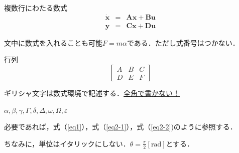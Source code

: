複数行にわたる数式
\begin{eqnarray}
 \bm{\dot x}&=&\bm{Ax}+\bm{Bu}\label{eq2-1} \\
 \bm{y}&=&\bm{Cx}+\bm{Du}\label{eq2-2}
\end{eqnarray}

文中に数式を入れることも可能$F=m\alpha$である．ただし式番号はつかない．

行列
\begin{equation}
 \begin{bmatrix} 
  A & B & C\\ 
  D & E & F 
 \end{bmatrix}
\end{equation}

ギリシャ文字は数式環境で記述する．\underline{全角で書かない！}

$\alpha,\beta,\gamma,\Gamma,\delta,\Delta,\omega,\Omega,\varepsilon$

必要であれば，式（\ref{eq1}），式（\ref{eq2-1}），式（\ref{eq2-2})のように参照する．

ちなみに，単位はイタリックにしない．$\theta=\frac{\pi}{2}[\mathrm{rad}]$とする．